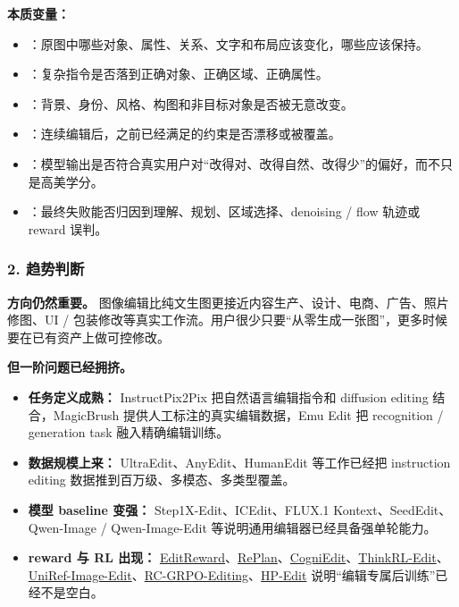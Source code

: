 \textbf{本质变量：}

\begin{itemize}[leftmargin=1.5em]
  \item {}：原图中哪些对象、属性、关系、文字和布局应该变化，哪些应该保持。
  \item {}：复杂指令是否落到正确对象、正确区域、正确属性。
  \item {}：背景、身份、风格、构图和非目标对象是否被无意改变。
  \item {}：连续编辑后，之前已经满足的约束是否漂移或被覆盖。
  \item {}：模型输出是否符合真实用户对“改得对、改得自然、改得少”的偏好，而不只是高美学分。
  \item {}：最终失败能否归因到理解、规划、区域选择、denoising / flow 轨迹或 reward 误判。
\end{itemize}

\subsubsection*{2. 趋势判断}

\textbf{方向仍然重要。} 图像编辑比纯文生图更接近内容生产、设计、电商、广告、照片修图、UI / 包装修改等真实工作流。用户很少只要“从零生成一张图”，更多时候要在已有资产上做可控修改。

\textbf{但一阶问题已经拥挤。}

\begin{itemize}[leftmargin=1.5em]
  \item \textbf{任务定义成熟：} InstructPix2Pix 把自然语言编辑指令和 diffusion editing 结合，MagicBrush 提供人工标注的真实编辑数据，Emu Edit 把 recognition / generation task 融入精确编辑训练。
  \item \textbf{数据规模上来：} UltraEdit、AnyEdit、HumanEdit 等工作已经把 instruction editing 数据推到百万级、多模态、多类型覆盖。
  \item \textbf{模型 baseline 变强：} Step1X-Edit、ICEdit、FLUX.1 Kontext、SeedEdit、Qwen-Image / Qwen-Image-Edit 等说明通用编辑器已经具备强单轮能力。
  \item \textbf{reward 与 RL 出现：} \href{https://arxiv.org/abs/2509.26346}{EditReward}、\href{https://arxiv.org/abs/2512.16864}{RePlan}、\href{https://arxiv.org/abs/2512.13276}{CogniEdit}、\href{https://arxiv.org/abs/2601.03467}{ThinkRL-Edit}、\href{https://arxiv.org/abs/2602.14186}{UniRef-Image-Edit}、\href{https://arxiv.org/abs/2604.09386}{RC-GRPO-Editing}、\href{https://arxiv.org/abs/2604.19406}{HP-Edit} 说明“编辑专属后训练”已经不是空白。
\end{itemize}

